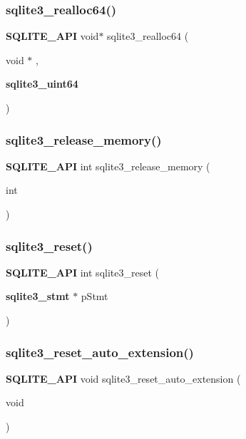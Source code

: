 \subsubsection{sqlite3\_realloc64()}
{\footnotesize\ttfamily \textbf{ S\+Q\+L\+I\+T\+E\+\_\+\+A\+PI} void$\ast$ sqlite3\+\_\+realloc64 (\begin{DoxyParamCaption}\item[{void $\ast$}]{,  }\item[{\textbf{ sqlite3\+\_\+uint64}}]{ }\end{DoxyParamCaption})}

\mbox{\label{sqlite3_8h_a91037e7ef182e008677dae146e15cf92}} 
\subsubsection{sqlite3\_release\_memory()}
{\footnotesize\ttfamily \textbf{ S\+Q\+L\+I\+T\+E\+\_\+\+A\+PI} int sqlite3\+\_\+release\+\_\+memory (\begin{DoxyParamCaption}\item[{int}]{ }\end{DoxyParamCaption})}

\mbox{\label{sqlite3_8h_a758efebc2e95694959ab0e74b397984c}} 
\subsubsection{sqlite3\_reset()}
{\footnotesize\ttfamily \textbf{ S\+Q\+L\+I\+T\+E\+\_\+\+A\+PI} int sqlite3\+\_\+reset (\begin{DoxyParamCaption}\item[{\textbf{ sqlite3\+\_\+stmt} $\ast$}]{p\+Stmt }\end{DoxyParamCaption})}

\mbox{\label{sqlite3_8h_ac33f4064ae6690cada7bdc89e8153ffc}} 
\subsubsection{sqlite3\_reset\_auto\_extension()}
{\footnotesize\ttfamily \textbf{ S\+Q\+L\+I\+T\+E\+\_\+\+A\+PI} void sqlite3\+\_\+reset\+\_\+auto\+\_\+extension (\begin{DoxyParamCaption}\item[{void}]{ }\end{DoxyParamCaption})}

